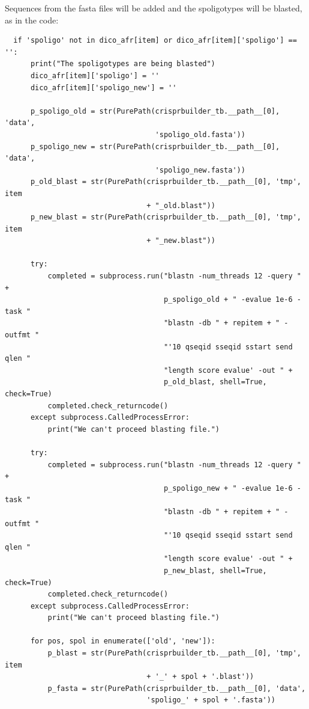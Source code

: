 \documentclass[twoside,a4paper,11pt,frenchb,openany]{report}
\begin{document}
    Sequences from the fasta files will be added and the spoligotypes will
be blasted, as in the code:

\begin{verbatim}
  if 'spoligo' not in dico_afr[item] or dico_afr[item]['spoligo'] == '':
      print("The spoligotypes are being blasted")
      dico_afr[item]['spoligo'] = ''
      dico_afr[item]['spoligo_new'] = ''

      p_spoligo_old = str(PurePath(crisprbuilder_tb.__path__[0], 'data',
                                   'spoligo_old.fasta'))
      p_spoligo_new = str(PurePath(crisprbuilder_tb.__path__[0], 'data',
                                   'spoligo_new.fasta'))
      p_old_blast = str(PurePath(crisprbuilder_tb.__path__[0], 'tmp', item
                                 + "_old.blast"))
      p_new_blast = str(PurePath(crisprbuilder_tb.__path__[0], 'tmp', item
                                 + "_new.blast"))

      try:
          completed = subprocess.run("blastn -num_threads 12 -query " +
                                     p_spoligo_old + " -evalue 1e-6 -task "
                                     "blastn -db " + repitem + " -outfmt "
                                     "'10 qseqid sseqid sstart send qlen "
                                     "length score evalue' -out " +
                                     p_old_blast, shell=True, check=True)
          completed.check_returncode()
      except subprocess.CalledProcessError:
          print("We can't proceed blasting file.")

      try:
          completed = subprocess.run("blastn -num_threads 12 -query " +
                                     p_spoligo_new + " -evalue 1e-6 -task "
                                     "blastn -db " + repitem + " -outfmt "
                                     "'10 qseqid sseqid sstart send qlen "
                                     "length score evalue' -out " +
                                     p_new_blast, shell=True, check=True)
          completed.check_returncode()
      except subprocess.CalledProcessError:
          print("We can't proceed blasting file.")

      for pos, spol in enumerate(['old', 'new']):
          p_blast = str(PurePath(crisprbuilder_tb.__path__[0], 'tmp', item
                                 + '_' + spol + '.blast'))
          p_fasta = str(PurePath(crisprbuilder_tb.__path__[0], 'data',
                                 'spoligo_' + spol + '.fasta'))


\end{verbatim}
\end{document}
